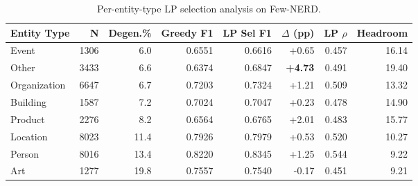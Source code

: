 \begin{table}[h]
\centering
\caption{Per-entity-type LP selection analysis on Few-NERD.}
\label{tab:per_type_lp}
\begin{tabular}{lrrrrrrr}
\toprule
Entity Type & N & Degen.\% & Greedy F1 & LP Sel F1 & $\Delta$ (pp) & LP $\rho$ & Headroom \\
\midrule
Event & 1306 & 6.0 & 0.6551 & 0.6616 & +0.65 & 0.457 & 16.14 \\
Other & 3433 & 6.6 & 0.6374 & 0.6847 & \textbf{+4.73} & 0.491 & 19.40 \\
Organization & 6647 & 6.7 & 0.7203 & 0.7324 & +1.21 & 0.509 & 13.32 \\
Building & 1587 & 7.2 & 0.7024 & 0.7047 & +0.23 & 0.478 & 14.90 \\
Product & 2276 & 8.2 & 0.6564 & 0.6765 & +2.01 & 0.483 & 15.77 \\
Location & 8023 & 11.4 & 0.7926 & 0.7979 & +0.53 & 0.520 & 10.27 \\
Person & 8016 & 13.4 & 0.8220 & 0.8345 & +1.25 & 0.544 & 9.22 \\
Art & 1277 & 19.8 & 0.7557 & 0.7540 & -0.17 & 0.451 & 9.21 \\
\bottomrule
\end{tabular}
\end{table}
